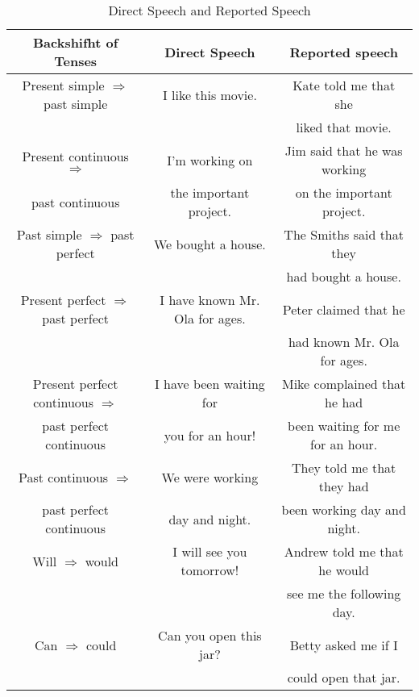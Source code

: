 \documentclass[hidelinks,10pt,a4paper]{article}
\begin{document}
\newpage
\begin{table}[h!]
\begin{center}
\begin{tabular}{|c|c|c|}
	\hline
	\textbf{Backshifht of Tenses} & \textbf{Direct Speech} & \textbf{Reported speech} \\ \hline

	Present simple $\Rightarrow$ past simple & I like this movie. & Kate told me that she \\
	& & liked that movie. \\ \hline

	Present continuous $\Rightarrow$ & I'm working on & Jim said that he was working \\
	past continuous  & the important project. & on the important project. \\ \hline

	Past simple $\Rightarrow$ past perfect & We bought a house. & The Smiths said that they \\
	& & had bought a house. \\ \hline

	Present perfect $\Rightarrow$ past perfect & I have known Mr. Ola for ages. & Peter claimed that he \\
	& & had known Mr. Ola for ages. \\ \hline

	Present perfect continuous $\Rightarrow$ & I have been waiting for & Mike complained that he had \\
	past perfect continuous & you for an hour! & been waiting for me for an hour. \\ \hline

	Past continuous $\Rightarrow$ & We were working & They told me that they had \\
	past perfect continuous & day and night. & been working day and night. \\ \hline

	Will $\Rightarrow$ would & I will see you tomorrow! & Andrew told me that he would \\
	& & see me the following day. \\ \hline

	Can $\Rightarrow$ could & Can you open this jar? & Betty asked me if I \\
	& & could open that jar. \\ \hline
\end{tabular}
\end{center}
\caption{Direct Speech and Reported Speech} \label{tab:dsrs}
\end{table}
\end{document}

